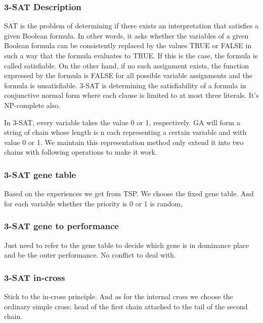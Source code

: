 \documentclass{acmtog} %
\begin{document}
\subsubsection{3-SAT Description}
\label{subsubsec:3satdescription}
\qquad

SAT is the problem of determining if there exists an interpretation that satisfies a given Boolean formula. In other words, it asks whether the variables of a given Boolean formula can be consistently replaced by the values TRUE or FALSE in such a way that the formula evaluates to TRUE. If this is the case, the formula is called satisfiable. On the other hand, if no such assignment exists, the function expressed by the formula is FALSE for all possible variable assignments and the formula is unsatisfiable. 3-SAT is determining the satisfiability of a formula in conjunctive normal form where each clause is limited to at most three literals. It's NP-complete also. 

In 3-SAT, every variable takes the value 0 or 1, respectively. GA will form a string of chain whose length is n each representing a certain variable and with value 0 or 1. We maintain this representation method only extend it into two chains with following operations to make it work.

\subsubsection{3-SAT gene table}
\label{subsubsec:3satgenetable}
\qquad

Based on the experiences we get from TSP. We choose the fixed gene table. And for each variable whether the priority is 0 or 1 is random,

\subsubsection{3-SAT gene to performance}
\label{subsubsec:3satperformance}
\qquad

Just need to refer to the gene table to decide which gene is in dominance place and be the outer performance. No conflict to deal with.

\subsubsection{3-SAT in-cross}
\label{subsubsec:3satcross}
\qquad

Stick to the in-cross principle. And as for the internal cross we choose the ordinary simple cross: head of the first chain attached to the tail of the second chain.
\end{document}
